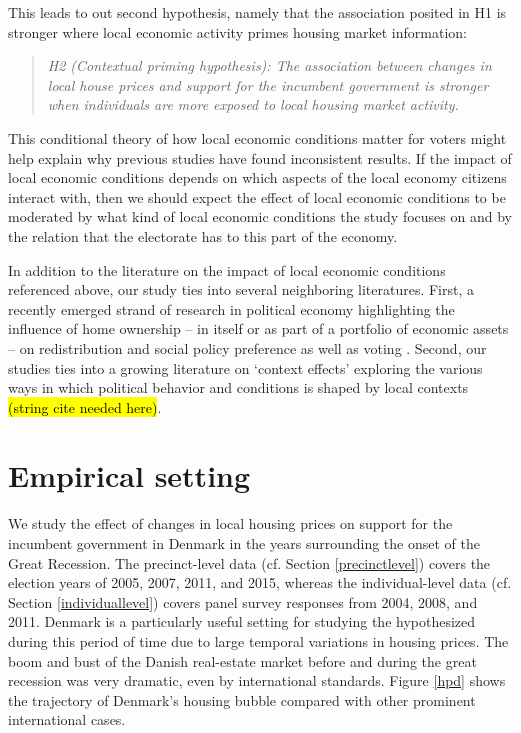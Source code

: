 \documentclass[12pt,a4paper]{article}
\begin{document}
	This leads to out second hypothesis, namely that the association posited in H1 is stronger where local economic activity primes housing market information:
	
	\newcommand{\htwo}{the contextual priming hypothesis}
	
	\begin{quote}
	\textit{H2 (Contextual priming hypothesis): The association between changes in local house prices and support for the incumbent government is stronger when individuals are more exposed to local housing market activity.}
	\end{quote}
	
	This conditional theory of how local economic conditions matter for voters might help explain why previous studies have found inconsistent results. If the impact of local economic conditions depends on which aspects of the local economy citizens interact with, then we should expect the effect of local economic conditions to be moderated by what kind of local economic conditions the study focuses on and by the relation that the electorate has to this part of the economy.
	
	In addition to the literature on the impact of local economic conditions referenced above, our study ties into several neighboring literatures. First, a recently emerged strand of research in political economy highlighting the influence of home ownership -- in itself or as part of a portfolio of economic assets -- on redistribution and social policy preference as well as voting \citep{ansell2014political,nadeau2010patrimonial,stubager2013reaching}. Second, our studies ties into a growing literature on `context effects' exploring the various ways in which political behavior and conditions is shaped by local contexts \hl{(string cite needed here)}. 
	
	\section{Empirical setting}
	
	We study the effect of changes in local housing prices on support for the incumbent government in Denmark in the years surrounding the onset of the Great Recession. The precinct-level data (cf. Section \ref{precinctlevel}) covers the election years of 2005, 2007, 2011, and 2015, whereas the individual-level data (cf. Section \ref{individuallevel}) covers panel survey responses from 2004, 2008, and 2011. Denmark is a particularly useful setting for studying the hypothesized during this period of time due to large temporal variations in housing prices. The boom and bust of the Danish real-estate market before and during the great recession was very dramatic, even by international standards. Figure \ref{hpd} shows the trajectory of Denmark's housing bubble compared with other prominent international cases.
	
\end{document}
